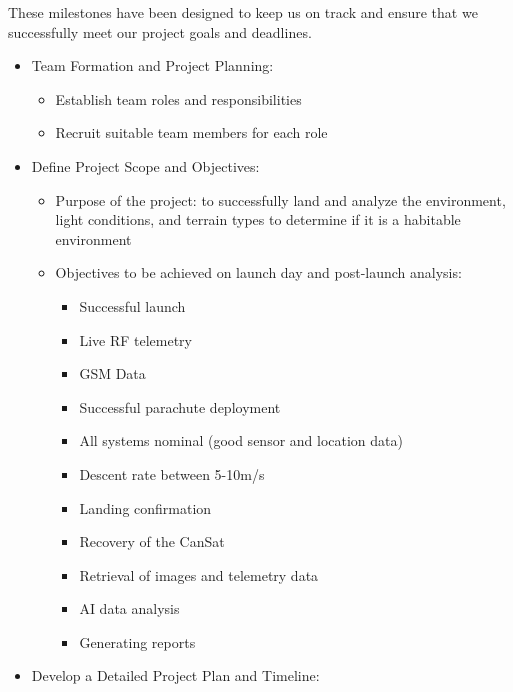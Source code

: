 \documentclass[11pt]{article}
\begin{document}
These milestones have been designed to keep us on track and ensure that we successfully meet our project goals and deadlines.
\begin{itemize}[leftmargin=1cm, itemindent=0.25cm, noitemsep, topsep=0pt, label=$\bullet$]
    \item Team Formation and Project Planning:
    \begin{itemize}[label=, noitemsep, topsep=2pt]
        \item Establish team roles and responsibilities
        \item Recruit suitable team members for each role
    \end{itemize}
    \item Define Project Scope and Objectives:
    \begin{itemize}[label=, noitemsep, topsep=2pt]
        \item Purpose of the project: to successfully land and analyze the environment, light conditions, and terrain types to determine if it is a habitable environment
        \item Objectives to be achieved on launch day and post-launch analysis:
        \begin{multicols}{2}
        \setlength{\topsep}{2pt}
        \setlength{\partopsep}{0pt}
        \begin{itemize}[label=, noitemsep, topsep=0pt]
        \item Successful launch
        \item Live RF telemetry
        \item GSM Data
        \item Successful parachute deployment
        \item All systems nominal (good sensor and location data)
        \item Descent rate between 5-10m/s
        \item Landing confirmation
        \item Recovery of the CanSat
        \item Retrieval of images and telemetry data
        \item AI data analysis
        \item Generating reports
        \end{itemize}
        \end{multicols}
    \end{itemize}
    \item Develop a Detailed Project Plan and Timeline:

\end{itemize}
\end{document}
